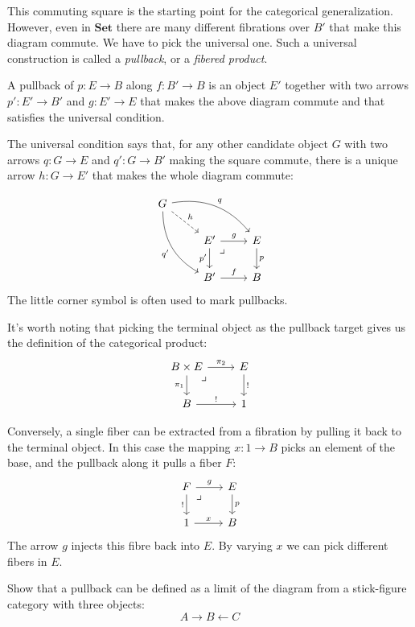 \documentclass[DaoFP]{subfiles}
\begin{document}
This commuting square is the starting point for the categorical generalization. However, even in $\mathbf{Set}$ there are many different fibrations over $B'$ that make this diagram commute. We have to pick the universal one. Such a universal construction is called a \emph{pullback}, or a \emph{fibered product}.

A pullback of $p \colon E \to B$ along $f \colon B' \to B$ is an object $E'$ together with two arrows $p' \colon E' \to B'$ and $g \colon E' \to E$ that makes the above diagram commute and that satisfies the universal condition. 

The universal condition says that, for any other candidate object $G$ with two arrows $q \colon G \to E$ and $q' \colon G \to B'$ making the square commute, there is a unique arrow $h \colon G \to E'$ that makes the whole diagram commute:

\[
 \begin{tikzcd}
 G
 \arrow[dr, dashed, "h"]
 \arrow[drr, bend left, "q"]
 \arrow[ddr, bend right, "q'"']
 \\
 &E'
 \arrow[r, "g"]
 \arrow[d, "p'"']
\arrow[dr, phantom,  , very near start, "\lrcorner"]
 &E
 \arrow[d, "p"]
 \\
 &B'
 \arrow[r, "f"]
 &B
  \end{tikzcd}
\]
The little corner symbol is often used to mark pullbacks.

It's worth noting that picking the terminal object as the pullback target gives us the definition of the categorical product:
\[
 \begin{tikzcd}
 B \times E
 \arrow[d, "\pi_1"']
 \arrow[r, "\pi_2"]
\arrow[dr, phantom,  , very near start, "\lrcorner"]
 & E
 \arrow[d, "!"]
 \\
 B
 \arrow[r, "!"]
 &
 1
  \end{tikzcd}
\]

Conversely, a single fiber can be extracted from a fibration by pulling it back to the terminal object. In this case the mapping $x \colon 1 \to B$ picks an element of the base, and the pullback along it pulls a fiber $F$:
\[
 \begin{tikzcd}
 F
 \arrow[d, "!"']
 \arrow[r, "g"]
\arrow[dr, phantom,  , very near start, "\lrcorner"]
 & E
 \arrow[d, "p"]
 \\
 1
 \arrow[r, "x"]
 &
 B
  \end{tikzcd}
\]
The arrow $g$ injects this fibre back into $E$. By varying $x$ we can pick different fibers in $E$.

\begin{exercise}
Show that a pullback can be defined as a limit of the diagram from a stick-figure category with three objects:
\[ A \rightarrow B \leftarrow C \]
\end{exercise}
\end{document}
